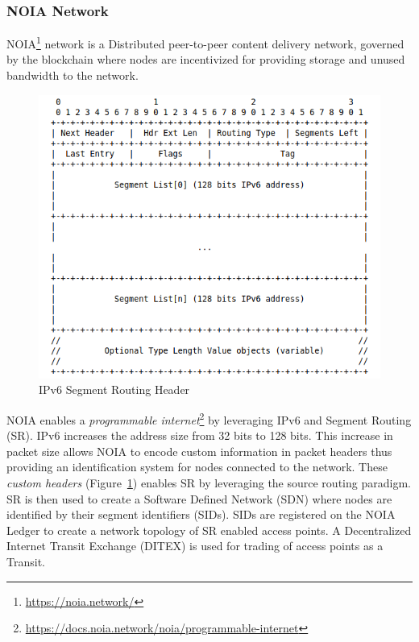 		\subsubsection{NOIA Network}
		NOIA\footnote{\url{https://noia.network/}} network is a Distributed peer-to-peer content delivery network, governed by the blockchain where nodes are incentivized for providing storage and unused bandwidth to the network.
		
		\begin{figure}[h]
			\includegraphics[width=\linewidth]{figures/ipv6-segment-header}
			\caption{\label{fig:segment-header} IPv6 Segment Routing Header\protect\footnotemark}
		\end{figure}
		
		NOIA enables a \textit{programmable internet}\footnote{\url{https://docs.noia.network/noia/programmable-internet}} by leveraging IPv6 and Segment Routing (SR). IPv6 increases the address size from 32 bits to 128 bits. This increase in packet size allows NOIA to encode custom information in packet headers thus providing an identification system for nodes connected to the network. These \textit{custom headers} (Figure~\ref{fig:segment-header}) enables SR by leveraging the source routing paradigm. SR is then used to create a Software Defined Network (SDN) where nodes are identified by their segment identifiers (SIDs). SIDs are registered on the NOIA Ledger to create a network topology of SR enabled access points. A Decentralized Internet Transit Exchange (DITEX) is used for trading of access points as a Transit.
		
